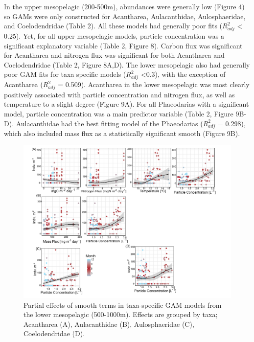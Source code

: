 \documentclass[
]{article}
\begin{document}
In the upper mesopelagic (200-500m), abundances were generally low
(Figure 4) so GAMs were only constructed for Acantharea, Aulacanthidae,
Aulosphaeridae, and Coelodendridae (Table 2). All these models had
generally poor fits (\(R^2_{adj}\) \textless{} 0.25). Yet, for all upper
mesopelagic models, particle concentration was a significant explanatory
variable (Table 2, Figure 8). Carbon flux was significant for Acantharea
and nitrogen flux was significant for both Acantharea and Coelodendridae
(Table 2, Figure 8A,D). The lower mesopelagic also had generally poor
GAM fits for taxa specific models (\(R^2_{adj}\) \textless0.3), with the
exception of Acantharea (\(R^2_{adj}\) = 0.509). Acantharea in the lower
mesopelagic was most clearly positively associated with particle
concentration and nitrogen flux, as well as temperature to a slight
degree (Figure 9A). For all Phaeodarias with a significant model,
particle concentration was a main predictor variable (Table 2, Figure
9B-D). Aulacanthidae had the best fitting model of the Phaeodarias
(\(R^2_{adj}\) = 0.298), which also included mass flux as a
statistically significant smooth (Figure 9B).

\begin{figure}

{\centering \includegraphics{images/08_lomeso-partials.pdf}

}

\caption{Partial effects of smooth terms in taxa-specific GAM models
from the lower mesopelagic (500-1000m). Effects are grouped by taxa;
Acantharea (A), Aulacanthidae (B), Aulosphaeridae (C), Coelodendridae
(D).}

\end{figure}
\end{document}
